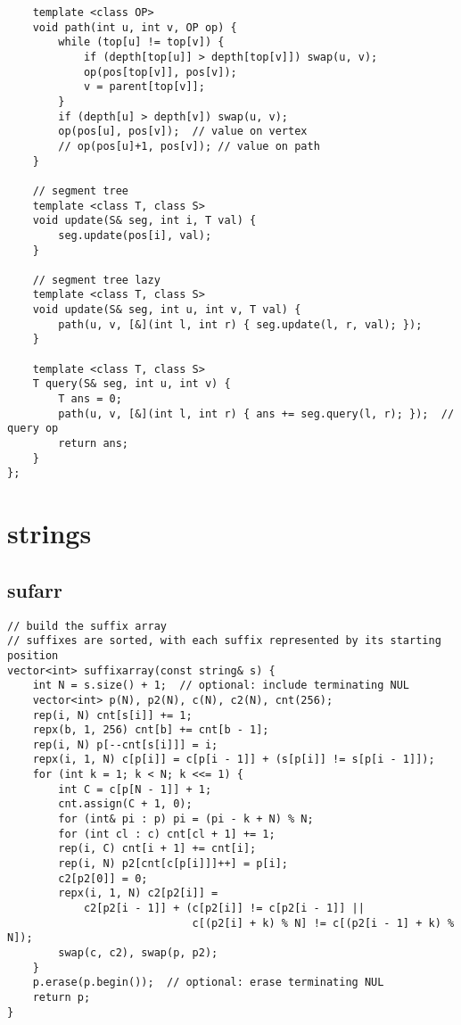 \documentclass[twoside]{article}
\begin{document}
\begin{multicols*}{2}
\begin{verbatim}
    template <class OP>
    void path(int u, int v, OP op) {
        while (top[u] != top[v]) {
            if (depth[top[u]] > depth[top[v]]) swap(u, v);
            op(pos[top[v]], pos[v]);
            v = parent[top[v]];
        }
        if (depth[u] > depth[v]) swap(u, v);
        op(pos[u], pos[v]);  // value on vertex
        // op(pos[u]+1, pos[v]); // value on path
    }

    // segment tree
    template <class T, class S>
    void update(S& seg, int i, T val) {
        seg.update(pos[i], val);
    }

    // segment tree lazy
    template <class T, class S>
    void update(S& seg, int u, int v, T val) {
        path(u, v, [&](int l, int r) { seg.update(l, r, val); });
    }

    template <class T, class S>
    T query(S& seg, int u, int v) {
        T ans = 0;
        path(u, v, [&](int l, int r) { ans += seg.query(l, r); });  // query op
        return ans;
    }
};
\end{verbatim}

{
[\vspace{2em}]
\section*{strings}
}
{
\subsection*{sufarr}
}
\begin{verbatim}
// build the suffix array
// suffixes are sorted, with each suffix represented by its starting position
vector<int> suffixarray(const string& s) {
    int N = s.size() + 1;  // optional: include terminating NUL
    vector<int> p(N), p2(N), c(N), c2(N), cnt(256);
    rep(i, N) cnt[s[i]] += 1;
    repx(b, 1, 256) cnt[b] += cnt[b - 1];
    rep(i, N) p[--cnt[s[i]]] = i;
    repx(i, 1, N) c[p[i]] = c[p[i - 1]] + (s[p[i]] != s[p[i - 1]]);
    for (int k = 1; k < N; k <<= 1) {
        int C = c[p[N - 1]] + 1;
        cnt.assign(C + 1, 0);
        for (int& pi : p) pi = (pi - k + N) % N;
        for (int cl : c) cnt[cl + 1] += 1;
        rep(i, C) cnt[i + 1] += cnt[i];
        rep(i, N) p2[cnt[c[p[i]]]++] = p[i];
        c2[p2[0]] = 0;
        repx(i, 1, N) c2[p2[i]] =
            c2[p2[i - 1]] + (c[p2[i]] != c[p2[i - 1]] ||
                             c[(p2[i] + k) % N] != c[(p2[i - 1] + k) % N]);
        swap(c, c2), swap(p, p2);
    }
    p.erase(p.begin());  // optional: erase terminating NUL
    return p;
}


\end{verbatim}
\end{multicols*}
\end{document}
